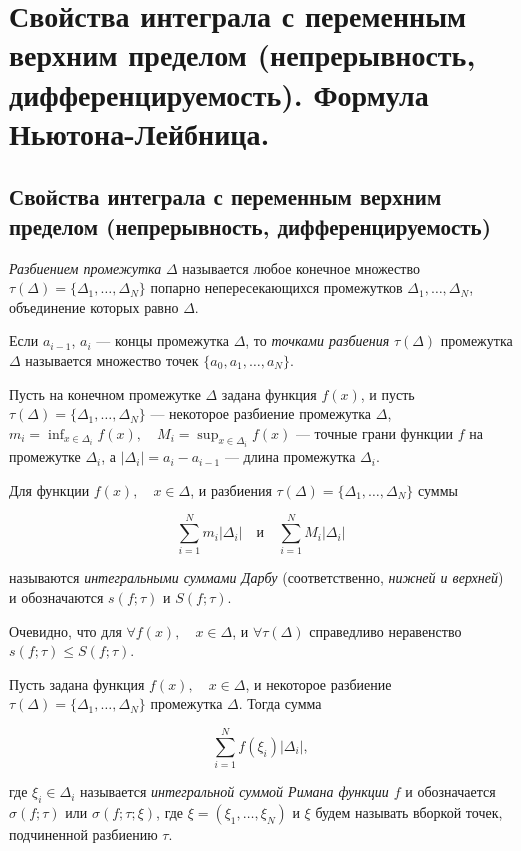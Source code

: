 \chapter{Свойства интеграла с переменным верхним пределом (непрерывность, дифференцируемость). Формула Ньютона-Лейбница.}
\section{Свойства интеграла с переменным верхним пределом (непрерывность, дифференцируемость)}

\begin{defn}
\textit{Разбиением промежутка} $\Delta$ называется любое конечное множество $\tau(\Delta) = \{ \Delta_1, \ldots, \Delta_N\}$ попарно непересекающихся промежутков $\Delta_1, \ldots, \Delta_N$, объединение которых равно $\Delta$.

Если $a_{i-1}$, $a_{i}$ — концы промежутка $\Delta$, то \textit{точками разбиения} $\tau(\Delta)$ промежутка $\Delta$ называется множество точек $\{a_0,a_1,\dots,a_N\}$.
\end{defn}

Пусть на конечном промежутке $\Delta$ задана функция $f(x)$, и пусть $\tau(\Delta) = \{ \Delta_1, \ldots, \Delta_N\}$ --- некоторое разбиение промежутка $\Delta$, $m_i = \inf_{x \in \Delta_i} f(x), \quad M_i = \sup_{x \in \Delta_i} f(x)$ --- точные грани функции $f$ на промежутке $\Delta_i$, а $|\Delta_i| = a_i - a_{i - 1}$ --- длина промежутка $\Delta_i$.

\begin{defn}
Для функции $f(x), \quad x \in \Delta$, и разбиения $\tau(\Delta) = \{ \Delta_1, \ldots, \Delta_N\}$ суммы 

$$
\sum_{i = 1}^{N}m_i|\Delta_i| \quad \text{и} \quad \sum_{i = 1}^{N}M_i|\Delta_i|
$$

называются \textit{интегральными суммами Дарбу} (соответственно, \textit{нижней и верхней}) и обозначаются $s(f; \tau)$ и $S(f; \tau)$.
\end{defn}

Очевидно, что для $\forall f(x), \quad x \in \Delta$, и $\forall \tau(\Delta)$ справедливо неравенство $s(f; \tau) \le S(f; \tau)$.

\begin{defn}
Пусть задана функция $f(x), \quad x \in \Delta$, и некоторое разбиение $\tau(\Delta) = \{ \Delta_1, \ldots, \Delta_N\}$ промежутка $\Delta$. Тогда сумма

$$
\sum_{i = 1}^{N} f(\xi_i)|\Delta_i|,
$$

где $\xi_i \in \Delta_i$ называется \textit{интегральной суммой Римана функции $f$} и обозначается $\sigma(f; \tau)$ или $\sigma(f; \tau; \xi)$, где $\xi = (\xi_1, \ldots, \xi_N)$ и $\xi$ будем называть вборкой точек, подчиненной разбиению $\tau$.
\end{defn}

